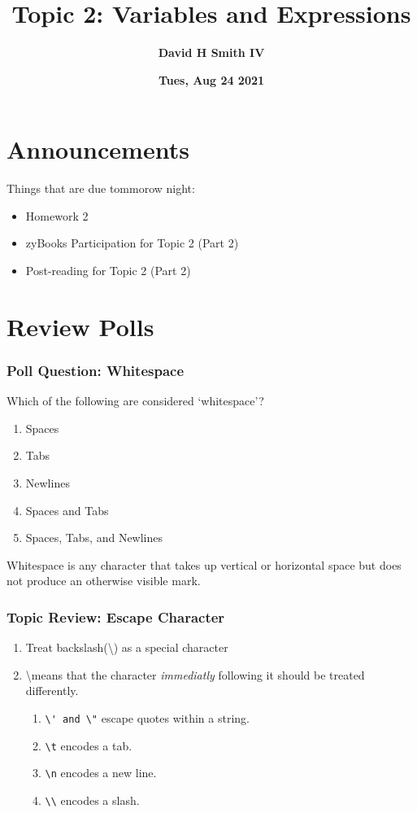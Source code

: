 \documentclass{beamer}
\title{\textbf{Topic 2: Variables and Expressions}}
\author{\textbf{David H Smith IV}}
\institute[\textbf{UIUC}]{\textbf{University of Illinois Urbana-Champaign}}
\date{\textbf{Tues, Aug 24 2021}}
\begin{document}
\frame{\titlepage}

\section{Announcements}

\begin{frame}
  Things that are due tommorow night:
    \begin{itemize}
      \item Homework 2
      \item zyBooks Participation for Topic 2 (Part 2) 
      \item Post-reading for Topic 2 (Part 2)
    \end{itemize}
\end{frame}

\section{Review Polls}

%
%
%
\begin{frame}[fragile]
  \frametitle{Poll Question: Whitespace}
  Which of the following are considered `whitespace'?
  \vfill
  \begin{enumerate}
    \item Spaces
    \item Tabs
    \item Newlines
    \item Spaces and Tabs
    \item Spaces, Tabs, and Newlines
  \end{enumerate}
  \pause
  \vfill
  Whitespace is any character that takes up vertical or horizontal space but does not produce an otherwise visible mark.
\end{frame}

%
%
%
\begin{frame}[fragile]
  \frametitle{Topic Review: Escape Character}
  \begin{enumerate}
    \item Treat backslash(\textbackslash) as a special character
    \item \textbackslash means that the character \textit{immediatly} following it should be treated differently.
      \begin{enumerate}
        \item \lstinline{\' and \"} escape quotes within a string.
        \item \lstinline{\t} encodes a tab.
        \item \lstinline{\n} encodes a new line.
        \item \lstinline{\\} encodes a slash.
      \end{enumerate}
  \end{enumerate}
\end{frame}
\end{document}
